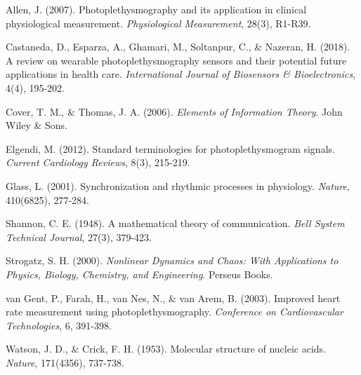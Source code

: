 \documentclass[12pt,a4paper]{article}
\begin{document}

\begin{thebibliography}{99}

Allen, J. (2007). Photoplethysmography and its application in clinical physiological measurement. \textit{Physiological Measurement}, 28(3), R1-R39.

Castaneda, D., Esparza, A., Ghamari, M., Soltanpur, C., \& Nazeran, H. (2018). A review on wearable photoplethysmography sensors and their potential future applications in health care. \textit{International Journal of Biosensors \& Bioelectronics}, 4(4), 195-202.

Cover, T. M., \& Thomas, J. A. (2006). \textit{Elements of Information Theory}. John Wiley \& Sons.

Elgendi, M. (2012). Standard terminologies for photoplethysmogram signals. \textit{Current Cardiology Reviews}, 8(3), 215-219.

Glass, L. (2001). Synchronization and rhythmic processes in physiology. \textit{Nature}, 410(6825), 277-284.

Shannon, C. E. (1948). A mathematical theory of communication. \textit{Bell System Technical Journal}, 27(3), 379-423.

Strogatz, S. H. (2000). \textit{Nonlinear Dynamics and Chaos: With Applications to Physics, Biology, Chemistry, and Engineering}. Perseus Books.

van Gent, P., Farah, H., van Nes, N., \& van Arem, B. (2003). Improved heart rate measurement using photoplethysmography. \textit{Conference on Cardiovascular Technologies}, 6, 391-398.

Watson, J. D., \& Crick, F. H. (1953). Molecular structure of nucleic acids. \textit{Nature}, 171(4356), 737-738.

\end{thebibliography}
\end{document}
